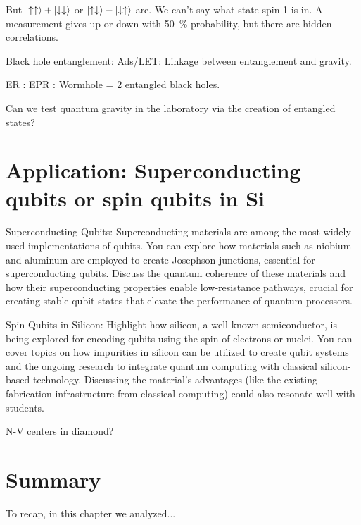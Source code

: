 \documentclass[12pt, english]{book}
\begin{document}
But $\ket{\uparrow \uparrow} + \ket{\downarrow \downarrow}$ or $\ket{\uparrow \downarrow} - \ket{\downarrow \uparrow}$ are. 
We can't say what state spin 1 is in.
A measurement gives up or down with \SI{50}{\percent} probability, but there are hidden correlations.

Black hole entanglement: Ads/LET: Linkage between entanglement and gravity.

ER : EPR : Wormhole = 2 entangled black holes.

Can we test quantum gravity in the laboratory via the creation of entangled states?



\section[Applications]{Application: Superconducting qubits or spin qubits in Si}

Superconducting Qubits: Superconducting materials are among the most widely used implementations of qubits. You can explore how materials such as niobium and aluminum are employed to create Josephson junctions, essential for superconducting qubits. Discuss the quantum coherence of these materials and how their superconducting properties enable low-resistance pathways, crucial for creating stable qubit states that elevate the performance of quantum processors.

Spin Qubits in Silicon: Highlight how silicon, a well-known semiconductor, is being explored for encoding qubits using the spin of electrons or nuclei. You can cover topics on how impurities in silicon can be utilized to create qubit systems and the ongoing research to integrate quantum computing with classical silicon-based technology. Discussing the material's advantages (like the existing fabrication infrastructure from classical computing) could also resonate well with students.

N-V centers in diamond?



\section{Summary}
To recap, in this chapter we analyzed...

\end{document}
